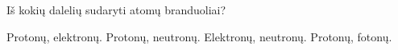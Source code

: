 \question Iš kokių dalelių sudaryti atomų branduoliai? \begin{choices}
    \choice Protonų, elektronų.
    \choice Protonų, neutronų.
    \choice Elektronų, neutronų.
    \choice Protonų, fotonų.
\end{choices}